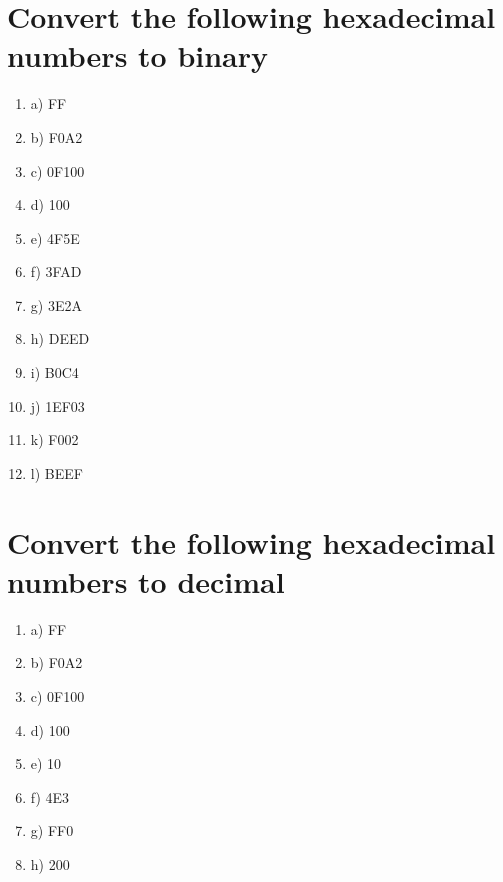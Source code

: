 \documentclass[11pt,a4paper]{article}
\begin{document}
\section{Convert the following hexadecimal numbers to binary}
\begin{enumerate}
	\item a) FF
	\item b) F0A2
	\item c) 0F100
	\item d) 100
	\item e) 4F5E
	\item f) 3FAD
	\item g) 3E2A
	\item h) DEED
	\item i) B0C4
	\item j) 1EF03
	\item k) F002
	\item l) BEEF
\end{enumerate}

\section{Convert the following hexadecimal numbers to decimal}
\begin{enumerate}
	\item a) FF
	\item b) F0A2
	\item c) 0F100
	\item d) 100
	\item e) 10
	\item f) 4E3
	\item g) FF0
	\item h) 200
\end{enumerate}
\end{document}
